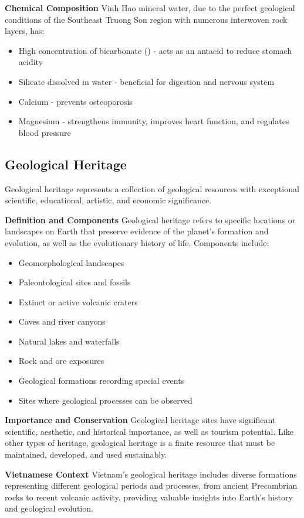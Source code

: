 \textbf{Chemical Composition}
Vinh Hao mineral water, due to the perfect geological conditions of the Southeast Truong Son region with numerous interwoven rock layers, has:
\begin{itemize}
\item High concentration of bicarbonate () - acts as an antacid to reduce stomach acidity
\item Silicate dissolved in water - beneficial for digestion and nervous system
\item Calcium - prevents osteoporosis
\item Magnesium - strengthens immunity, improves heart function, and regulates blood pressure
\end{itemize}



\subsection{Geological Heritage}

Geological heritage represents a collection of geological resources with exceptional scientific, educational, artistic, and economic significance.

\textbf{Definition and Components}
Geological heritage refers to specific locations or landscapes on Earth that preserve evidence of the planet's formation and evolution, as well as the evolutionary history of life. Components include:
\begin{itemize}
\item Geomorphological landscapes
\item Paleontological sites and fossils
\item Extinct or active volcanic craters
\item Caves and river canyons
\item Natural lakes and waterfalls
\item Rock and ore exposures
\item Geological formations recording special events
\item Sites where geological processes can be observed
\end{itemize}

\textbf{Importance and Conservation}
Geological heritage sites have significant scientific, aesthetic, and historical importance, as well as tourism potential. Like other types of heritage, geological heritage is a finite resource that must be maintained, developed, and used sustainably.

\textbf{Vietnamese Context}
Vietnam's geological heritage includes diverse formations representing different geological periods and processes, from ancient Precambrian rocks to recent volcanic activity, providing valuable insights into Earth's history and geological evolution.